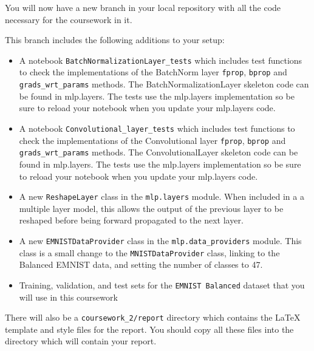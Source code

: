 \documentclass[11pt,]{article}
\begin{document}
You will now have a new branch in your local repository with all the
code necessary for the coursework in it.   

This branch includes the following additions to your setup:

\begin{itemize}
\itemsep1pt\parskip0pt
\item
  A notebook \verb+BatchNormalizationLayer_tests+ which includes 
  test functions to check the implementations of the BatchNorm layer
  \texttt{fprop}, \texttt{bprop} and \texttt{grads\_wrt\_params}
  methods. The BatchNormalizationLayer skeleton code can be found in mlp.layers. 
  The tests use the mlp.layers implementation so be sure to reload your notebook
  when you update your mlp.layers code.
\item
  A notebook \verb+Convolutional_layer_tests+ which includes
  test functions to check the implementations of the Convolutional layer
  \texttt{fprop}, \texttt{bprop} and \texttt{grads\_wrt\_params}
  methods. The ConvolutionalLayer skeleton code can be found in mlp.layers. 
  The tests use the mlp.layers implementation so be sure to reload your notebook
  when you update your mlp.layers code.
\item
  A new \texttt{ReshapeLayer} class in the \verb+mlp.layers+ module.
  When included in a a multiple layer model, this allows the output of
  the previous layer to be reshaped before being forward propagated to
  the next layer.
\item
  A new \texttt{EMNISTDataProvider} class in the \verb+mlp.data_providers+ module.
  This class is a small change to the \texttt{MNISTDataProvider} class, linking to the Balanced EMNIST data, and setting the number of classes to 47.
\item
  Training, validation, and test sets for the \texttt{EMNIST Balanced} dataset that
  you will use in this coursework
\end{itemize}



There will also be a \verb+coursework_2/report+ directory which contains the LaTeX template and style files for the report.  You should copy all these files into the directory which will contain your report.
\end{document}
